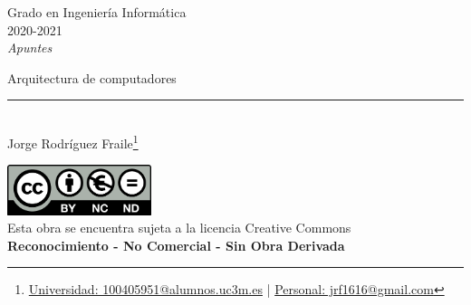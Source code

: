 \documentclass[12pt, twoside, openright]{report} %
\begin{document}
	
\begin{titlepage}
	\begin{sffamily}
	\color{azulUC3M}
	\begin{center}
		\begin{figure}[H] %
		\end{figure}
		\vspace{2.5cm}
		\begin{Large}
			Grado en Ingeniería Informática\\			
			2020-2021\\
			\vspace{2cm}		
			\textsl{Apuntes}\\
			\bigskip
		\end{Large}
		 	{\Huge Arquitectura de computadores}\\
		 	\vspace*{0.5cm}
	 		\rule{10.5cm}{0.1mm}\\
			\vspace*{0.9cm}
			{\LARGE Jorge Rodríguez Fraile\footnote{\href{mailto:100405951@alumnos.uc3m.es}{Universidad: 100405951@alumnos.uc3m.es}  |  \href{mailto:jrf1616@gmail.com}{Personal: jrf1616@gmail.com}}}\\ 
			\vspace*{1cm}
	\end{center}
	\vfill
	\color{black}
		\includegraphics[width=4.2cm]{img/creativecommons.png}\\
		Esta obra se encuentra sujeta a la licencia Creative Commons\\ \textbf{Reconocimiento - No Comercial - Sin Obra Derivada}
	\end{sffamily}
\end{titlepage}


\tableofcontents
\thispagestyle{fancy}
\end{document}
